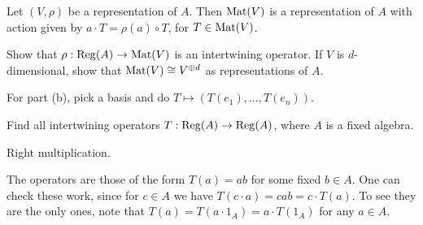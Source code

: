 \begin{sproblem}
	\label{prob:reg_mat}
	Let $(V, \rho)$ be a representation of $A$.
	Then $\mathrm{Mat}(V)$ is a representation of $A$
	with action given by $a \cdot T = \rho(a) \circ T$, for $T \in \mathrm{Mat}(V)$.
	\begin{enumerate}[(a)]
		\ii Show that $\rho : \operatorname{Reg}(A) \to \mathrm{Mat}(V)$ is an intertwining operator.
		\ii If $V$ is $d$-dimensional, show that $\mathrm{Mat}(V) \cong V^{\oplus d}$
		as representations of $A$.
	\end{enumerate}
	\begin{hint}
		For part (b), pick a basis and do $T \mapsto (T(e_1), \dots, T(e_n))$.
	\end{hint}
\end{sproblem}

\begin{sproblem}
	\label{prob:regA_intertwine}
	Find all intertwining operators $T : \operatorname{Reg}(A) \to \operatorname{Reg}(A)$,
	where $A$ is a fixed algebra.
	\begin{hint}
		Right multiplication.
	\end{hint}
	\begin{sol}
		The operators are those of the form $T(a) = ab$
		for some fixed $b \in A$.
		One can check these work, since for $c \in A$
		we have $T(c \cdot a) = cab = c \cdot T(a)$.
		To see they are the only ones, note that
		$T(a) = T(a \cdot 1_A) = a \cdot T(1_A)$ for any $a \in A$.
	\end{sol}
\end{sproblem}
